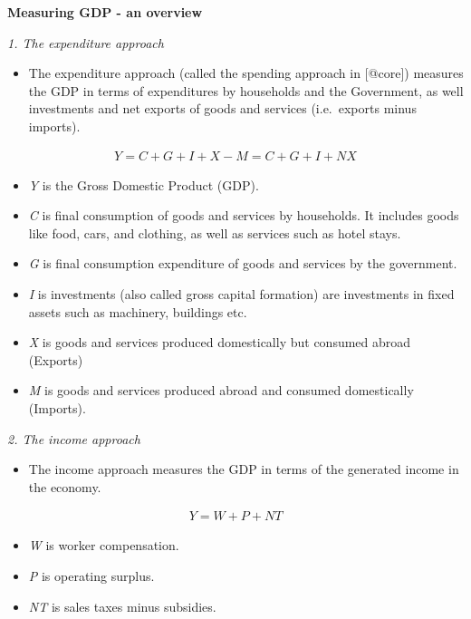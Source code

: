 \documentclass[]{book}
\providecommand{\tightlist}{%
  \setlength{\itemsep}{0pt}\setlength{\parskip}{0pt}}
\newenvironment{myblock}%
{%
 \begin{tcolorbox}%
}%
{\end{tcolorbox}}%
\begin{document}
\begin{myblock}
\textbf{Measuring GDP - an overview}

\emph{1. The expenditure approach}

\begin{itemize}
\tightlist
\item
  The expenditure approach (called the spending approach in {[}@core{]})
  measures the GDP in terms of expenditures by households and the
  Government, as well investments and net exports of goods and services
  (i.e.~exports minus imports).
\end{itemize}

\begin{align}
  Y=C+G+I+X-M=C+G+I+NX
\end{align}

\begin{itemize}
\tightlist
\item
  \emph{Y} is the Gross Domestic Product (GDP).
\item
  \emph{C} is final consumption of goods and services by households. It
  includes goods like food, cars, and clothing, as well as services such
  as hotel stays.
\item
  \emph{G} is final consumption expenditure of goods and services by the
  government.
\item
  \emph{I} is investments (also called gross capital formation) are
  investments in fixed assets such as machinery, buildings etc.
\item
  \emph{X} is goods and services produced domestically but consumed
  abroad (Exports)
\item
  \emph{M} is goods and services produced abroad and consumed
  domestically (Imports).
\end{itemize}

\emph{2. The income approach}

\begin{itemize}
\tightlist
\item
  The income approach measures the GDP in terms of the generated income
  in the economy.
\end{itemize}

\begin{align}
   Y=W+P+NT
\end{align}

\begin{itemize}
\tightlist
\item
  \emph{W} is worker compensation.
\item
  \emph{P} is operating surplus.
\item
  \emph{NT} is sales taxes minus subsidies.
\end{itemize}


\end{myblock}
\end{document}

